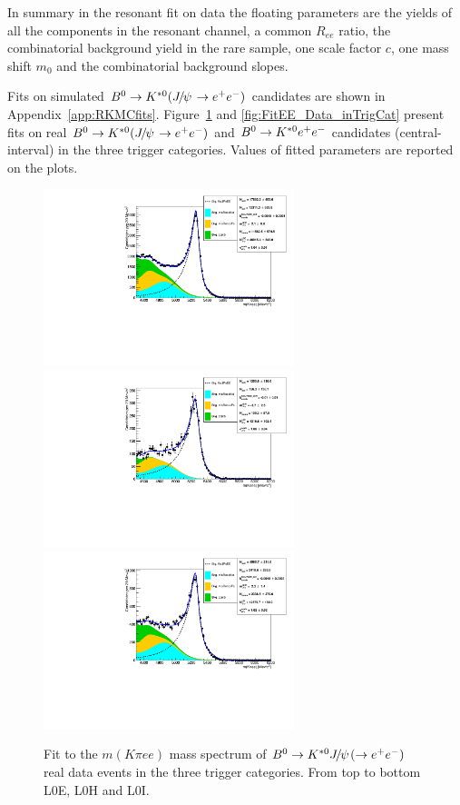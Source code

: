 In summary in the resonant fit on data the floating parameters are the yields of all the components
in the resonant channel, a common $R_{ee}$ ratio, the combinatorial background yield in the rare sample,
one scale factor $c$, one mass shift $m_0$ and the combinatorial background slopes.

Fits on simulated $\Bz\to\Kstarz(\jpsi\to\epem)$ candidates 
are shown in Appendix~\ref{app:RKMCfits}. Figure~\ref{fig:FitJpsiEE_Data_inTrigCat} and \ref{fig:FitEE_Data_inTrigCat}
present fits on real $\Bz\to\Kstarz(\jpsi\to\epem)$ and ${{B}^0}\rightarrow{\ensuremath{{K}^{*0}}} {\ensuremath{e^+e^-}}$ candidates (central-\qsq interval)
in the three trigger categories. Values of fitted parameters are reported on the plots.

\begin{figure}[h!]
\centering
\includegraphics[width=0.65\textwidth]{RKst/figs/fit_EEs_0_EE-q2central-gmc/KstJPsEE_L0E.pdf}
\includegraphics[width=0.65\textwidth]{RKst/figs/fit_EEs_0_EE-q2central-gmc/KstJPsEE_L0H.pdf}
\includegraphics[width=0.65\textwidth]{RKst/figs/fit_EEs_0_EE-q2central-gmc/KstJPsEE_L0I.pdf}
\caption{Fit to the $m(K\pi ee)$ mass spectrum of $\Bz \to \Kstarz \jpsi(\rightarrow \ee)$
real data events in the three trigger categories. From top to bottom L0E, L0H and L0I.}
\label{fig:FitJpsiEE_Data_inTrigCat}
\end{figure}
